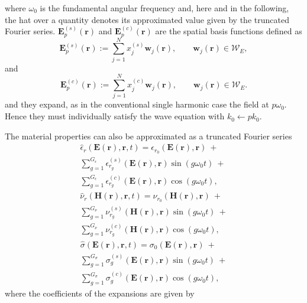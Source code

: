 \noindent where $\omega_0$ is the fundamental angular frequency and, here and in the following, the hat over a quantity denotes its approximated value given by
the truncated Fourier series. 
$\mathbf{E}_{p}^{(s)}(\mathbf{r})$ and $\mathbf{E}_{p}^{(c)}(\mathbf{r})$ are the spatial basis functions defined as
$$
\mathbf{E}_{p}^{(s)}(\mathbf{r}) := \sum_{j=1}^{N} x_j^{(s)} \mathbf{w}_j(\mathbf{r}), \qquad \mathbf{w}_j(\mathbf{r}) \in \mathcal{W}_E,
$$ and
$$
\mathbf{E}_{p}^{(c)}(\mathbf{r}) := \sum_{j=1}^{N} x_j^{(c)} \mathbf{w}_j(\mathbf{r}), \qquad \mathbf{w}_j(\mathbf{r}) \in \mathcal{W}_E.
$$
and they expand, as in the conventional single harmonic case the field at $p\omega_0$. Hence they must individually satisfy the wave equation with $k_0 \leftarrow pk_0$.

The material properties can also be approximated as a truncated Fourier series \cite{copeland2010domain}
%
\begin{multline} \label{eq:matfourier}
\hat{{\epsilon}}_r(\mathbf{E}(\mathbf{r}), \mathbf{r}, t) = {\epsilon}_{r_0}(\mathbf{E}(\mathbf{r}),\mathbf{r}) \ + \\
\sum^{G_\epsilon}_{g=1} {\epsilon}_{r_g}^{(s)}(\mathbf{E}(\mathbf{r}),\mathbf{r}) \sin(g \omega_0 t) \ + \ \\ \sum^{G_\epsilon}_{g=1}  {\epsilon}_{r_g}^{(c)}(\mathbf{E}(\mathbf{r}),\mathbf{r}) \cos(g \omega_0 t),
\end{multline} 
\begin{multline} 
\hat{{\nu}}_r(\mathbf{H}(\mathbf{r}), \mathbf{r}, t) = {\nu}_{r_0}(\mathbf{H}(\mathbf{r}),\mathbf{r}) \ + \\ \sum^{G_\nu}_{g=1}  {\nu}_{r_g}^{(s)}(\mathbf{H}(\mathbf{r}),\mathbf{r}) \sin(g \omega_0 t) \ + \\
 \sum^{G_\nu}_{g=1} {\nu}_{r_g}^{(c)}(\mathbf{H}(\mathbf{r}),\mathbf{r}) \cos(g \omega_0 t),
\end{multline} 
\begin{multline} 
\hat{{\sigma}}(\mathbf{E}(\mathbf{r}), \mathbf{r}, t) = {\sigma}_{0}(\mathbf{E}(\mathbf{r}),\mathbf{r}) \ + \\
\sum^{G_\sigma}_{g=1} {\sigma}_{g}^{(s)}(\mathbf{E}(\mathbf{r}),\mathbf{r}) \sin(g \omega_0 t) \ + \\
\sum^{G_\sigma}_{g=1} {\sigma}_{g}^{(c)} (\mathbf{E}(\mathbf{r}),\mathbf{r}) \cos(g \omega_0 t),
\end{multline}
where the coefficients of the expansions are given by
